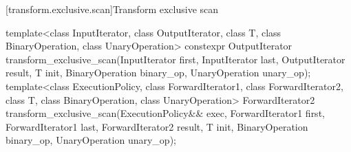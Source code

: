 [transform.exclusive.scan]{Transform exclusive scan}

%
\begin{itemdecl}
template<class InputIterator, class OutputIterator, class T,
         class BinaryOperation, class UnaryOperation>
  constexpr OutputIterator
    transform_exclusive_scan(InputIterator first, InputIterator last,
                             OutputIterator result, T init,
                             BinaryOperation binary_op, UnaryOperation unary_op);
template<class ExecutionPolicy,
         class ForwardIterator1, class ForwardIterator2, class T,
         class BinaryOperation, class UnaryOperation>
  ForwardIterator2
    transform_exclusive_scan(ExecutionPolicy&& exec,
                             ForwardIterator1 first, ForwardIterator1 last,
                             ForwardIterator2 result, T init,
                             BinaryOperation binary_op, UnaryOperation unary_op);
\end{itemdecl}

